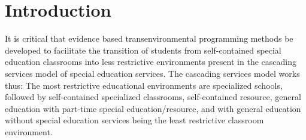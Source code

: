 \documentclass[twoside]{article}
\begin{document}
\section{Introduction}
It is critical that evidence based transenvironmental programming methods be developed to facilitate the transition of students from self-contained special education classrooms into less restrictive environments present in the cascading services model of special education services. The cascading services model works thus: The most restrictive educational environments are specialized schools, followed by self-contained specialized classrooms, self-contained resource, general education with part-time special education/resource, and with general education without special education services being the least restrictive classroom environment. 
\end{document}
